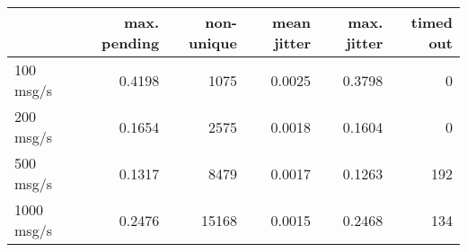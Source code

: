 \begin{tabular}{l|rrrrr}
\rowcolor{gray!50}
 & max. pending & non-unique & mean jitter & max. jitter & timed out\\\hline
100 msg/s & 0.4198 & 1075 & 0.0025 & 0.3798 & 0 \\
200 msg/s & 0.1654 & 2575 & 0.0018 & 0.1604 & 0 \\
500 msg/s & 0.1317 & 8479 & 0.0017 & 0.1263 & 192 \\
1000 msg/s & 0.2476 & 15168 & 0.0015 & 0.2468 & 134 \\
\end{tabular}
